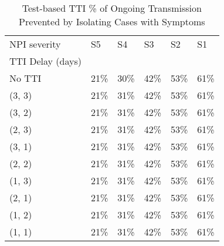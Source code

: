 \documentclass{article}
\begin{document}
    \begin{table}[H]
        \centering
         \begin{tabular}{llllll}
\toprule
NPI severity &    S5 &    S4 &    S3 &    S2 &    S1 \\
TTI Delay (days) &       &       &       &       &       \\
\midrule
No TTI           &  21\% &  30\% &  42\% &  53\% &  61\% \\
(3, 3)           &  21\% &  31\% &  42\% &  53\% &  61\% \\
(3, 2)           &  21\% &  31\% &  42\% &  53\% &  61\% \\
(2, 3)           &  21\% &  31\% &  42\% &  53\% &  61\% \\
(3, 1)           &  21\% &  31\% &  42\% &  53\% &  61\% \\
(2, 2)           &  21\% &  31\% &  42\% &  53\% &  61\% \\
(1, 3)           &  21\% &  31\% &  42\% &  53\% &  61\% \\
(2, 1)           &  21\% &  31\% &  42\% &  53\% &  61\% \\
(1, 2)           &  21\% &  31\% &  42\% &  53\% &  61\% \\
(1, 1)           &  21\% &  31\% &  42\% &  53\% &  61\% \\
\bottomrule
\end{tabular}

        \caption{Test-based TTI \% of Ongoing Transmission Prevented by Isolating Cases with Symptoms}
    \end{table}
    
\end{document}
